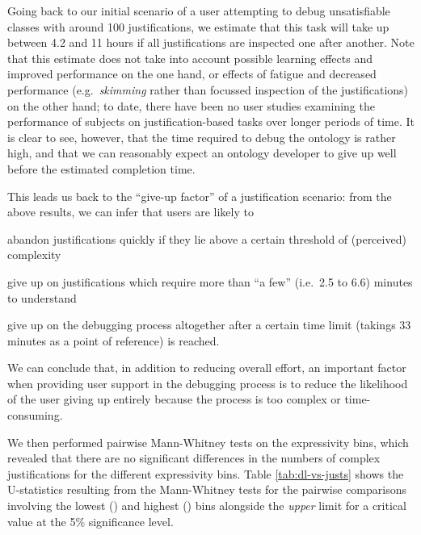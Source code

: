 Going back to our initial scenario of a user attempting to debug unsatisfiable classes with around 100 justifications, we estimate that this task will take up between 4.2 and 11 hours if all justifications are inspected one after another. Note that this estimate does not take into account possible learning effects and improved performance on the one hand, or effects of fatigue and decreased performance (e.g.\ \emph{skimming} rather than focussed inspection of the justifications) on the other hand; to date, there have been no user studies examining the performance of subjects on justification-based tasks over longer periods of time. It is clear to see, however, that the time required to debug the ontology is rather high, and that we can reasonably expect an ontology developer to give up well before the estimated completion time. 

This leads us back to the \enquote{give-up factor} of a justification scenario: from the above results, we can infer that users are likely to 
\begin{compactitem}
\item abandon justifications quickly if they lie above a certain threshold of (perceived) complexity
\item give up on justifications which require more than \enquote{a few} (i.e.\ 2.5 to 6.6) minutes to understand
\item give up on the debugging process altogether after a certain time limit (takings 33 minutes as a point of reference) is reached.
\end{compactitem}

We can conclude that, in addition to reducing overall effort, an important factor when providing user support in the debugging process is to reduce the likelihood of the user giving up entirely because the process is too complex or time-consuming.



 We then performed pairwise Mann-Whitney tests on the expressivity bins, which revealed that there are no significant differences in the numbers of complex justifications for the different expressivity bins. Table \ref{tab:dl-vs-justs} shows the U-statistics resulting from the Mann-Whitney tests for the pairwise comparisons involving the lowest (\elplusplus) and highest () bins alongside the \emph{upper} limit for a critical value at the 5\% significance level.


